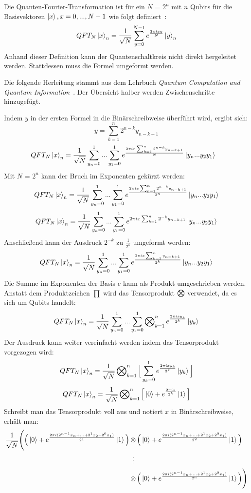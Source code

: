 Die Quanten-Fourier-Transformation ist für ein \(N\) = \(2^n\) mit \(n\) Qubits
für die Basisvektoren \(\ket{x}, x = 0,...,N-1\) wie folgt definiert~\cite[216]{homeister2023quantum215}:
\[QFT_{N}\ket{x}_{n} = \frac{1}{\sqrt{N}}\sum_{y=0}^{N-1}  e^{\frac{2 \pi i x y}{N}}\ket{y}_{n}\]
Anhand dieser Definition kann der Quantenschaltkreis nicht direkt hergeleitet werden.
Stattdessen muss die Formel umgeformt werden.

Die folgende Herleitung stammt aus dem Lehrbuch \textit{Quantum Computation and Quantum Information}~\cite[218]{nielsen_chuang_2010}.
Der Übersicht halber werden Zwischenschritte hinzugefügt.

Indem \(y\) in der ersten Formel in die Binärschreibweise überführt wird, ergibt sich:
\[ y = \sum_{k=1}^{n}2^{n-k} y_{n-k+1}\]  
\begin{align}
  QFT_{N}\ket{x}_{n} &=
    \frac{1}{\sqrt{N}}
    \sum_{y_n=0}^{1} ...
    \sum_{y_1=0}^{1} e^{\frac{2 \pi i x \sum_{k=1}^{n}2^{n-k} y_{n-k+1}}{N}}
    \ket{y_n ... y_{2}y_{1}}
\end{align}
Mit \(N\) = \(2^n\) kann der Bruch im Exponenten gekürzt werden:
\[QFT_{N}\ket{x}_{n} = \frac{1}{\sqrt{N}}\sum_{y_n=0}^{1}...\sum_{y_1=0}^{1}  e^{\frac{2 \pi i x \sum_{k=1}^{n}2^{n-k} y_{n-k+1}}{2^n}}\ket{y_n ... y_{2}y_{1}}\]
\[QFT_{N}\ket{x}_{n} = \frac{1}{\sqrt{N}}\sum_{y_n=0}^{1}...\sum_{y_1=0}^{1}  e^{2 \pi i x \sum_{k=1}^{n}2^{-k} y_{n-k+1}}\ket{y_n ... y_{2}y_{1}}\]
Anschließend kann der Ausdruck \(2^{-k}\) zu \(\frac{1}{2^k}\) umgeformt werden: 
\[QFT_{N}\ket{x}_{n} = \frac{1}{\sqrt{N}}\sum_{y_n=0}^{1}...\sum_{y_1=0}^{1}  e^{\frac{2 \pi i x \sum_{k=1}^{n} y_{n-k+1}}{2^k}}\ket{y_n ... y_{2}y_{1}}\]
Die Summe im Exponenten der Basis \(e\) kann als Produkt umgeschrieben werden.
Anstatt dem Produktzeichen \(\prod\) wird das Tensorprodukt \(\operatorname{\bigotimes}\) verwendet, da es sich um Qubits handelt:
\[QFT_{N}\ket{x}_{n} = \frac{1}{\sqrt{N}}\sum_{y_n=0}^{1}...\sum_{y_1=0}^{1} \operatorname{\bigotimes}_{k=1}^n{ e^{\frac{2 \pi i x y_k}{2^k}}}\ket{y_{k}}\]
Der Ausdruck kann weiter vereinfacht werden indem das Tensorprodukt vorgezogen wird:
\[QFT_{N}\ket{x}_{n} = \frac{1}{\sqrt{N}}\operatorname{\bigotimes}_{k=1}^n \Big[  \sum_{y_k=0}^{1}{ e^{\frac{2 \pi i x y_k}{2^k}}}\ket{y_{k}}\Big]\]
\[QFT_{N}\ket{x}_{n} = \frac{1}{\sqrt{N}}\operatorname{\bigotimes}_{k=1}^n \Big[  \ket{0} + { e^{\frac{2 \pi i x}{2^k}}}\ket{1}\Big]\] 
Schreibt man das Tensorprodukt voll aus und notiert \(x\) in Binärschreibweise, erhält man:
\begin{align*}
\frac{1}{\sqrt{N}}\Bigg(
  \Big(\ket{0} + { e^{\frac{2 \pi i (2^{n-1}x_n+...+2^1x_2+2^0x_1)}{2^1}}}\ket{1}\Big)
  &\tensor
  \Big(\ket{0} + { e^{\frac{2 \pi i (2^{n-1}x_n+...+2^1x_2+2^0x_1)}{2^2}}}\ket{1}\Big) \\
  &\vdotswithin{\tensor} \\
  &\tensor
  \Big(\ket{0} + { e^{\frac{2 \pi i (2^{n-1}x_n+...+2^1x_2+2^0x_1)}{2^n}}}\ket{1}\Big)
  \Bigg)
\end{align*}
